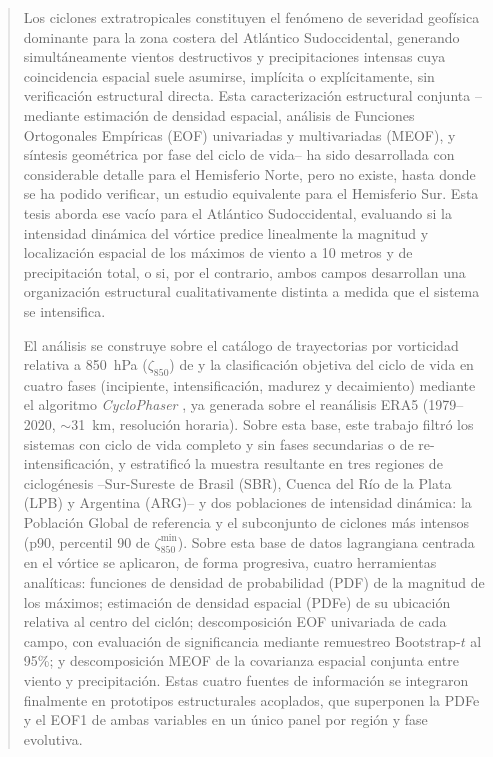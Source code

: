 
\begin{abstract}
Los ciclones extratropicales constituyen el fenómeno de severidad geofísica dominante para la zona costera del Atlántico Sudoccidental, generando simultáneamente vientos destructivos y precipitaciones intensas cuya coincidencia espacial suele asumirse, implícita o explícitamente, sin verificación estructural directa. Esta caracterización estructural conjunta --mediante estimación de densidad espacial, análisis de Funciones Ortogonales Empíricas (EOF) univariadas y multivariadas (MEOF), y síntesis geométrica por fase del ciclo de vida-- ha sido desarrollada con considerable detalle para el Hemisferio Norte, pero no existe, hasta donde se ha podido verificar, un estudio equivalente para el Hemisferio Sur. Esta tesis aborda ese vacío para el Atlántico Sudoccidental, evaluando si la intensidad dinámica del vórtice predice linealmente la magnitud y localización espacial de los máximos de viento a 10 metros y de precipitación total, o si, por el contrario, ambos campos desarrollan una organización estructural cualitativamente distinta a medida que el sistema se intensifica.

El análisis se construye sobre el catálogo de trayectorias por vorticidad relativa a 850~hPa ($\zeta_{850}$) de \citet{gramcianinov2019properties} y la clasificación objetiva del ciclo de vida en cuatro fases (incipiente, intensificación, madurez y decaimiento) mediante el algoritmo \textit{CycloPhaser} \citep{coutodesouza2024new, deSouza2025CycloPhaser}, ya generada sobre el reanálisis ERA5 (1979--2020, $\sim$31~km, resolución horaria). Sobre esta base, este trabajo filtró los sistemas con ciclo de vida completo y sin fases secundarias o de re-intensificación, y estratificó la muestra resultante en tres regiones de ciclogénesis --Sur-Sureste de Brasil (SBR), Cuenca del Río de la Plata (LPB) y Argentina (ARG)-- y dos poblaciones de intensidad dinámica: la Población Global de referencia y el subconjunto de ciclones más intensos (p90, percentil 90 de $\zeta_{850}^{\min}$). Sobre esta base de datos lagrangiana centrada en el vórtice se aplicaron, de forma progresiva, cuatro herramientas analíticas: funciones de densidad de probabilidad (PDF) de la magnitud de los máximos; estimación de densidad espacial (PDFe) de su ubicación relativa al centro del ciclón; descomposición EOF univariada de cada campo, con evaluación de significancia mediante remuestreo Bootstrap-$t$ al 95\%; y descomposición MEOF de la covarianza espacial conjunta entre viento y precipitación. Estas cuatro fuentes de información se integraron finalmente en prototipos estructurales acoplados, que superponen la PDFe y el EOF1 de ambas variables en un único panel por región y fase evolutiva.


\end{abstract}
